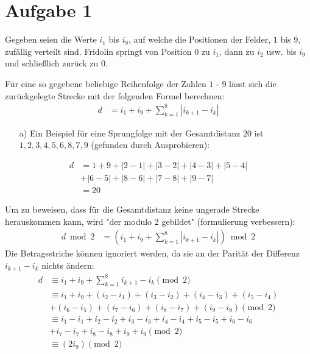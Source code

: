 \documentclass[12pt,a4paper,oneside]{article}
\begin{document}
\pagestyle{fancy}
\fancyfoot[C]{\thepage}

\section[]{Aufgabe 1}

Gegeben seien die Werte $i_1$ bis $i_9$, auf welche die Positionen der Felder, $1$ bis $9$, zufällig verteilt sind.
Fridolin springt von Position $0$ zu $i_1$, dann zu $i_2$ usw. bis $i_9$ und schließlich zurück zu $0$.

Für eine so gegebene beliebige Reihenfolge der Zahlen $1$ - $9$ lässt sich die zurückgelegte Strecke mit der folgenden Formel berechnen:
\begin{align*}
	d &= i_1 + i_9 + \sum_{k=1}^{8} |i_{k+1} - i_k|
\end{align*}
\begin{itemize}
	\item[a)] Ein Beispiel für eine Sprungfolge mit der Gesamtdistanz $20$ ist $1, 2, 3, 4, 5, 6, 8, 7, 9$ (gefunden durch Ausprobieren):
\end{itemize}
\begin{align*}
	d &= 1 + 9 + |2-1|+|3-2|+|4-3|+|5-4| \\
	&+ |6-5|+|8-6|+|7-8|+|9-7| \\
	&= 20
\end{align*}

Um zu beweisen, dass für die Gesamtdistanz keine ungerade Strecke herauskommen kann, wird "der modulo 2 gebildet" (formulierung verbessern):
\begin{align*}
	d \bmod 2 &= \left(i_1 + i_9 + \sum_{k=1}^{8} |i_{k+1} - i_k|\right) \bmod 2
\end{align*}
Die Betragsstriche können ignoriert werden, da sie an der Parität der Differenz $i_{k+1}-i_k$ nichts ändern:
\begin{align*}
	d &\equiv i_1 + i_9 + \sum_{k=1}^{8} i_{k+1} - i_k \pmod 2 \\
	&\equiv i_1 + i_9 + (i_2 - i_1) + (i_3 - i_2) + (i_4 - i_3) + (i_5 - i_4) \\
	&+ (i_6 - i_5) + (i_7 - i_6) + (i_8 - i_7) + (i_9 - i_8) \pmod 2 \\[7pt]
	&\equiv i_1 - i_1 + i_2 - i_2 + i_3 - i_3 + i_4 - i_4 + i_5 - i_5 + i_6 - i_6 \\
	&+ i_7 - i_7 + i_8 - i_8 + i_9 + i_9 \pmod 2 \\[7pt]
	&\equiv \left(2 i_9\right) \pmod 2
\end{align*}
\end{document}

